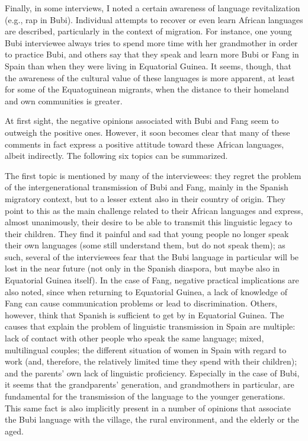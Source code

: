 \documentclass[output=paper]{langscibook}
\begin{document}
Finally, in some interviews, I noted a certain awareness of language revitalization (e.g., rap in Bubi). Individual attempts to recover or even learn African languages are described, particularly in the context of migration. For instance, one young Bubi interviewee always tries to spend more time with her grandmother in order to practice Bubi, and others say that they speak and learn more Bubi or Fang in Spain than when they were living in Equatorial Guinea. It seems, though, that the awareness of the cultural value of these languages is more apparent, at least for some of the Equatoguinean migrants, when the distance to their homeland and own communities is greater.

At first sight, the negative opinions associated with Bubi and Fang seem to outweigh the positive ones. However, it soon becomes clear that many of these comments in fact express a positive attitude toward these African languages, albeit indirectly. The following six topics can be summarized.

The first topic is mentioned by many of the interviewees: they regret the problem of the intergenerational transmission of Bubi and Fang, mainly in the Spanish migratory context, but to a lesser extent also in their country of origin. They point to this as the main challenge related to their African languages and express, almost unanimously, their desire to be able to transmit this linguistic legacy to their children. They find it painful and sad that young people no longer speak their own languages (some still understand them, but do not speak them); as such, several of the interviewees fear that the Bubi language in particular will be lost in the near future (not only in the Spanish diaspora, but maybe also in Equatorial Guinea itself). In the case of Fang, negative practical implications are also noted, since when returning to Equatorial Guinea, a lack of knowledge of Fang can cause communication problems or lead to discrimination. Others, however, think that Spanish is sufficient to get by in Equatorial Guinea. The causes that explain the problem of linguistic transmission in Spain are multiple: lack of contact with other people who speak the same language; mixed, multilingual couples; the different situation of women in Spain with regard to work (and, therefore, the relatively limited time they spend with their children); and the parents’ own lack of linguistic proficiency. Especially in the case of Bubi, it seems that the grandparents’ generation, and grandmothers in particular, are fundamental for the transmission of the language to the younger generations. This same fact is also implicitly present in a number of opinions that associate the Bubi language with the village, the rural environment, and the elderly or the aged.
\end{document}
